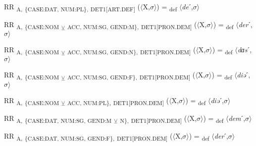 {\begin{exe}
 RR \textsubscript{A,} \textsubscript{\{CASE:DAT, NUM:PL\},} \textsubscript{DET1[ART.DEF]} ($\langle$X,$\sigma $$\rangle$) = \textsubscript{def} $\langle$\textit{de}ˊ,$\sigma $$\rangle$
\end{exe}

\begin{exe}
 RR \textsubscript{A,} \textsubscript{\{CASE:NOM} \textsubscript{${\veebar}$}\textsubscript{ ACC, NUM:SG, GEND:M\},} \textsubscript{DET1[PRON.DEM]} ($\langle$X,$\sigma $$\rangle$) = \textsubscript{def} $\langle$\textit{der}ˊ,$\sigma $$\rangle$
\end{exe}

\begin{exe}
 RR \textsubscript{A,} \textsubscript{\{CASE:NOM} \textsubscript{${\veebar}$}\textsubscript{ ACC, NUM:SG, GEND:N\},} \textsubscript{DET1[PRON.DEM]} ($\langle$X,$\sigma $$\rangle$) = \textsubscript{def} $\langle$\textit{dɑs}ˊ,$\sigma $$\rangle$
\end{exe}

\begin{exe}
 RR \textsubscript{A,} \textsubscript{\{CASE:NOM} \textsubscript{${\veebar}$}\textsubscript{ ACC, NUM:SG, GEND:F\},} \textsubscript{DET1[PRON.DEM]} ($\langle$X,$\sigma $$\rangle$) = \textsubscript{def} $\langle$\textit{diə}ˊ,$\sigma $$\rangle$
\end{exe}

\begin{exe}
 RR \textsubscript{A,} \textsubscript{\{CASE:NOM} \textsubscript{${\veebar}$}\textsubscript{ ACC, NUM:PL\},} \textsubscript{DET1[PRON.DEM]} ($\langle$X,$\sigma $$\rangle$) = \textsubscript{def} $\langle$\textit{diə}ˊ,$\sigma $$\rangle$
\end{exe}

\begin{exe}
 RR \textsubscript{A,} \textsubscript{\{CASE:DAT, NUM:SG, GEND:M} \textsubscript{${\veebar}$}\textsubscript{ N\},} \textsubscript{DET1[PRON.DEM]} ($\langle$X,$\sigma $$\rangle$) = \textsubscript{def} $\langle$\textit{dem}ˊ,$\sigma $$\rangle$
\end{exe}

\begin{exe}
 RR \textsubscript{A,} \textsubscript{\{CASE:DAT, NUM:SG, GEND:F\},} \textsubscript{DET1[PRON.DEM]} ($\langle$X,$\sigma $$\rangle$) = \textsubscript{def} $\langle$\textit{der}ˊ,$\sigma $$\rangle$
\end{exe}

}

